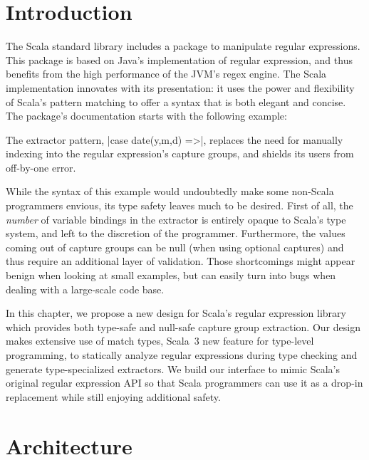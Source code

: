 \section{Introduction}

The Scala standard library includes a package to manipulate regular expressions.
This package is based on Java's implementation of regular expression, and thus benefits from the high performance of the JVM's regex engine.
The Scala implementation innovates with its presentation: it uses the power and flexibility of Scala's pattern matching to offer a syntax that is both elegant and concise.
The package's documentation starts with the following example:

\regexDocumentation

\noindent
The extractor pattern, |case date(y,m,d) =>|, replaces the need for manually indexing into the regular expression's capture groups, and shields its users from off-by-one error.

While the syntax of this example would undoubtedly make some non-Scala programmers envious, its type safety leaves much to be desired.
First of all, the \emph{number} of variable bindings in the extractor is entirely opaque to Scala's type system, and left to the discretion of the programmer.
Furthermore, the values coming out of capture groups can be null (when using optional captures) and thus require an additional layer of validation.
Those shortcomings might appear benign when looking at small examples, but can easily turn into bugs when dealing with a large-scale code base.

In this chapter, we propose a new design for Scala's regular expression library which provides both type-safe and null-safe capture group extraction.
Our design makes extensive use of match types, Scala~3 new feature for type-level programming, to statically analyze regular expressions during type checking and generate type-specialized extractors.
We build our interface to mimic Scala's original regular expression API so that Scala programmers can use it as a drop-in replacement while still enjoying additional safety.

\section{Architecture}

